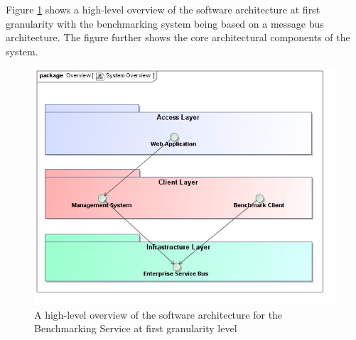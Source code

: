 Figure \ref{fig:softwareArchitecture} shows a high-level overview of the
software architecture at first granularity with the benchmarking system being
based on a message bus  architecture. The figure further shows the core
architectural components of the system.
\begin{figure}[H]
  \begin{center}
  \includegraphics[scale=0.4]{../Diagrams and Charts/Overview/System Overview.jpg}
  \caption{A high-level overview of the software architecture for the Benchmarking Service at first granularity level}
  \label{fig:softwareArchitecture}
  \end{center}
\end{figure}

